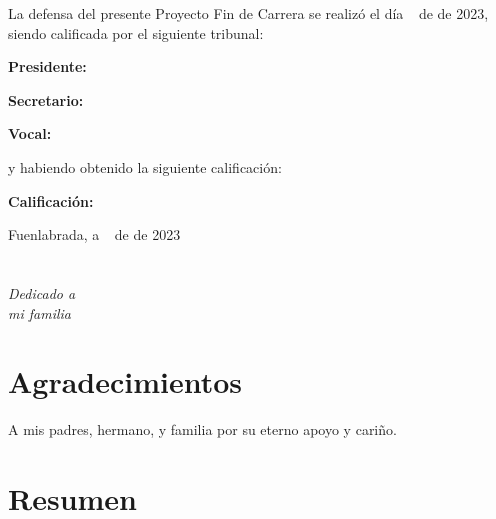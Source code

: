 \documentclass[a4paper, 12pt]{book}
\begin{document}
\vspace{1cm}
La defensa del presente Proyecto Fin de Carrera se realizó el día \qquad$\;\,$ de \qquad\qquad\qquad\qquad \newline de 2023, siendo calificada por el siguiente tribunal:


\vspace{0.5cm}
\textbf{Presidente:}

\vspace{1.2cm}
\textbf{Secretario:}

\vspace{1.2cm}
\textbf{Vocal:}


\vspace{1.2cm}
y habiendo obtenido la siguiente calificación:

\vspace{1cm}
\textbf{Calificación:}


\vspace{1cm}
\begin{flushright}
Fuenlabrada, a \qquad$\;\,$ de \qquad\qquad\qquad\qquad de 2023
\end{flushright}


\chapter*{}
\begin{flushright}
\textit{Dedicado a \\
mi familia}
\end{flushright}


\chapter*{Agradecimientos}

A mis padres, hermano, y familia por su eterno apoyo y cariño.


\chapter*{Resumen}
\end{document}
